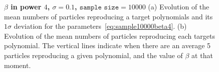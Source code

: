 \documentclass[11pt]{article}
\begin{document}
\begin{enumerate}
	  \begin{figure}[h!]
	  	\centering
	  	\caption{{\bfseries \boldmath $\beta$ in power $4$, $\sigma = 0.1$, $\texttt{sample size} = 10000$} (a) Evolution of the mean numbers of particles reproducing a target polynomials and its $1\sigma$ deviation for the parameters~\eqref{eq:sample10000beta4}. (b) Evolution of the mean numbers of particles reproducing each targets polynomial. The vertical lines indicate when there are an average 5 particles reproducing a given polynomial, and the value of $\beta$ at that moment.}
	  	\label{fig:sample10000beta4}
	  \end{figure}


\end{enumerate}
\end{document}
